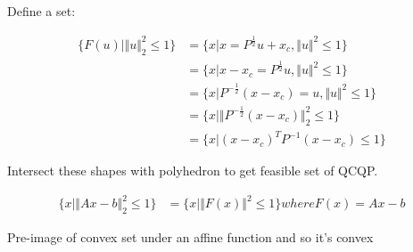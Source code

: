Define a set:

\begin{align*}
\{F(u) | \Vert u\Vert^2_2 \leq 1 \} &= \{x|x = P^{\frac{1}{2}}u+x_c, \Vert u\Vert^2 \leq 1 \}\\
&= \{x|x - x_c = P^{\frac{1}{2}}u, \Vert u\Vert^2 \leq 1 \}\\
&= \{x|P^{-\frac{1}{2}}(x - x_c) =u, \Vert u\Vert^2 \leq 1 \}\\
&= \{x|\Vert P^{-\frac{1}{2}}(x - x_c)\Vert^2_2 \leq 1 \}\\
&= \{x|(x - x_c)^TP^{-1}(x - x_c) \leq 1 \}
\end{align*}

Intersect these shapes with polyhedron to get feasible set of QCQP.

\begin{example}
	\begin{align*}
	\{x | \Vert Ax - b \Vert^2_2 \leq 1 \} &= \{x | \Vert F(x) \Vert^2 \leq 1 \}  where F(x) = Ax - b
	\end{align*}
	
	Pre-image of convex set under an affine function and so it's convex
\end{example}





